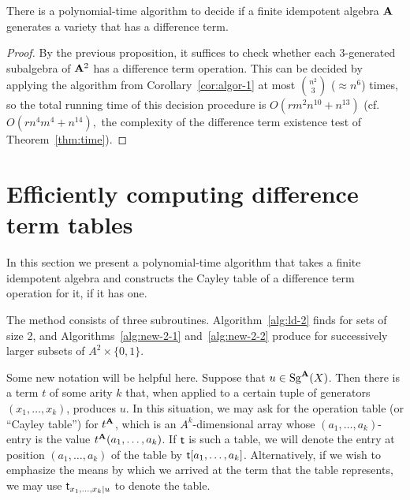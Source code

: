 \begin{corollary}
  There is a polynomial-time algorithm to decide if a finite idempotent algebra $\mathbf{A}$ generates a variety that has a difference term.
\end{corollary}

\begin{proof}
  By the previous proposition, it suffices to check whether each 3-generated subalgebra of
  $\mathbf{A}^2$ has a difference term operation. This can be decided by applying the
  algorithm from Corollary~\ref{cor:algor-1} at most $\binom{n^2}{3}$ ($\approx n^6$) times,
  so the total running time of this decision procedure is $O(rm^2n^{10} + n^{13})$ (cf.~$O(rn^4m^4 + n^{14}),$
  the complexity of the difference term existence test of Theorem~\ref{thm:time}).
\end{proof}

\section{Efficiently computing difference term tables}
\label{sec:comp-diff-term}
In this section we present a polynomial-time algorithm that takes
a finite idempotent algebra and constructs the Cayley table of
a difference term operation for it, if it has one.

The method consists of three subroutines.
Algorithm~\ref{alg:ld-2} finds \ldtos for sets
of size 2, and Algorithms~\ref{alg:new-2-1} and~\ref{alg:new-2-2}
produce \ldtos for successively larger subsets of $A^2 \times \{0,1\}$.

Some new notation will be helpful here.  Suppose that $ u \in \operatorname{Sg}^{\mathbf{A}}(X)$.
Then there is a term $t$ of some arity $k$ that, when applied to a certain tuple of
generators $(x_1, \dots, x_k)$, produces $u$.
In this situation, we may ask for the operation table (or ``Cayley table'')
for $t^{\mathbf{A}}$, which is an $A^k$-dimensional array whose $(a_1, \dots, a_k)$-entry
is the value $t^{\mathbf{A}}(a_1, \dots, a_k)$.
If $\mathsf{t}$ is such a table, we will denote the
entry at position $(a_1, \dots, a_k)$ of the table by $\mathsf{t}[a_1, \dots, a_k]$.
Alternatively, if we wish to emphasize the means by which
we arrived at the term that the table represents, we may use
$\mathsf{t}_{x_1,\dots, x_k \mid u}$ to denote the table.

\newcommand{\tripzu}{\ensuremath{(a_0, b_0, 0), (a_1, b_1, 1)}}


